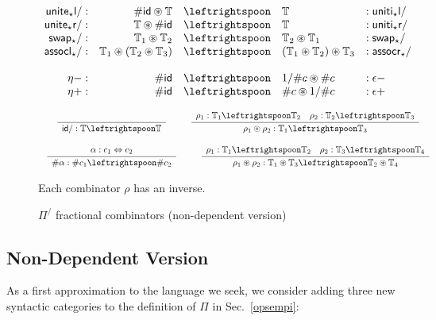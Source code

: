 \documentclass[a4paper,USenglish]{lipics-v2016-utf8x}
\newcommand{\hash}{\#}
\newcommand{\isotwo}{\Leftrightarrow}
\newcommand{\order}[1]{\hash #1}
\newcommand{\iorder}[1]{1/\hash #1}
\newcommand{\Rule}[4]{
\makebox{{\rm #1}
$\displaystyle
\frac{\begin{array}{l}#2\\\end{array}}
{\begin{array}{l}#3\\\end{array}}$
 #4}}
\newcommand{\jdg}[3]{{#1} #3}
\newcommand{\unitetl}{\mathsf{{unite_{\star}l}}}
\newcommand{\unititl}{\mathsf{{uniti_{\star}l}}}
\newcommand{\unitetr}{\mathsf{{unite_{\star}r}}}
\newcommand{\unititr}{\mathsf{{uniti_{\star}r}}}
\newcommand{\swapt}{\mathsf{{swap_{\star}}}}
\newcommand{\assoclt}{\mathsf{{assocl_{\star}}}}
\newcommand{\assocrt}{\mathsf{{assocr_{\star}}}}
\newcommand{\idiso}{\mathsf{{id}}}
\begin{document}
\begin{figure}[t]
\[\begin{array}{rrcll}
\unitetl/ :&  \order{\idiso} \circledast \mathbb{T} & \leftrightspoon & \mathbb{T} &: \unititl/ \\
\unitetr/ :&  \mathbb{T} \circledast \order{\idiso} & \leftrightspoon & \mathbb{T} &: \unititr/ \\
\swapt/ :&  \mathbb{T}_1 \circledast \mathbb{T}_2 & \leftrightspoon & \mathbb{T}_2 \circledast \mathbb{T}_1 &: \swapt/ \\
\assoclt/ :&  \mathbb{T}_1 \circledast (\mathbb{T}_2 \circledast \mathbb{T}_3) & \leftrightspoon & (\mathbb{T}_1 \circledast \mathbb{T}_2) \circledast \mathbb{T}_3
  &: \assocrt/ \\
\\
\eta- :& \order{\idiso} & \leftrightspoon & \iorder{c} \circledast \order{c} &: \epsilon- \\
\eta+ :& \order{\idiso} & \leftrightspoon & \order{c} \circledast \iorder{c} &: \epsilon+ \\
\end{array}\]

\[\begin{array}{c}
\Rule{}
{}
{\jdg{}{}{\idiso/ : \mathbb{T} \leftrightspoon \mathbb{T}}}
{}
\qquad
\Rule{}
{\jdg{}{}{\rho_1 : \mathbb{T}_1 \leftrightspoon \mathbb{T}_2} \quad \rho_2 : \mathbb{T}_2 \leftrightspoon \mathbb{T}_3}
{\jdg{}{}{\rho_1 \circledcirc \rho_2 : \mathbb{T}_1 \leftrightspoon \mathbb{T}_3}}
{}
\\
\\
\Rule{}
{\jdg{}{}{\alpha : c_1 \isotwo c_2}}
{\jdg{}{}{\order{\alpha} : \order{c_1}  \leftrightspoon \order{c_2}}}
{}
\qquad
\Rule{}
{\jdg{}{}{\rho_1 : \mathbb{T}_1 \leftrightspoon \mathbb{T}_2} \quad \rho_2 : \mathbb{T}_3 \leftrightspoon \mathbb{T}_4}
{\jdg{}{}{\rho_1 \circledast \rho_2 : \mathbb{T}_1 \circledast \mathbb{T}_3 \leftrightspoon \mathbb{T}_2 \circledast \mathbb{T}_4}}
{}
\end{array}\]

Each combinator $\rho$ has an inverse.
\caption{$\Pi^/$ fractional combinators (non-dependent version)}
\label{pifrac:comb}
\end{figure}

\subsection{Non-Dependent Version}

As a first approximation to the language we seek, we consider adding three new
syntactic categories to the definition of $\Pi$ in Sec.~\ref{opsempi}:
\end{document}

